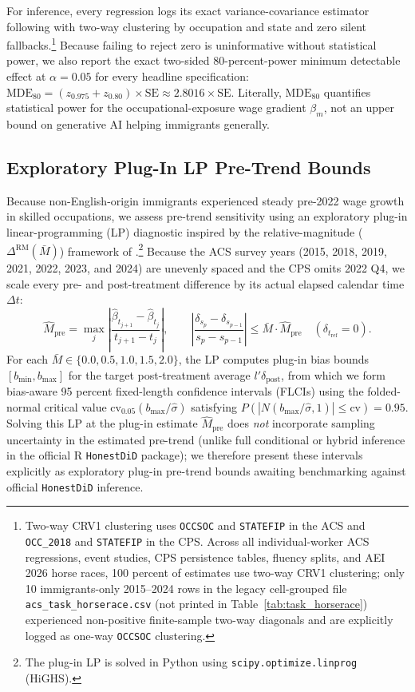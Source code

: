 \documentclass[11pt]{amsart}
\begin{document}
For inference, every regression logs its exact variance-covariance estimator following \citet{CameronGelbachMiller2011} with two-way clustering by occupation and state and zero silent fallbacks.\footnote{Two-way CRV1 clustering uses \texttt{OCCSOC} and \texttt{STATEFIP} in the ACS and \texttt{OCC\_2018} and \texttt{STATEFIP} in the CPS. Across all individual-worker ACS regressions, event studies, CPS persistence tables, fluency splits, and AEI 2026 horse races, 100 percent of estimates use two-way CRV1 clustering; only 10 immigrants-only 2015--2024 rows in the legacy cell-grouped file \texttt{acs\_task\_horserace.csv} (not printed in Table~\ref{tab:task_horserace}) experienced non-positive finite-sample two-way diagonals and are explicitly logged as one-way \texttt{OCCSOC} clustering.} Because failing to reject zero is uninformative without statistical power, we also report the exact two-sided 80-percent-power minimum detectable effect at $\alpha = 0.05$ for every headline specification: $\text{MDE}_{80} = (z_{0.975} + z_{0.80}) \times \text{SE} \approx 2.8016 \times \text{SE}$. Literally, $\text{MDE}_{80}$ quantifies statistical power for the occupational-exposure wage gradient $\beta_m$, not an upper bound on generative AI helping immigrants generally.

\subsection{Exploratory Plug-In LP Pre-Trend Bounds}

Because non-English-origin immigrants experienced steady pre-2022 wage growth in skilled occupations, we assess pre-trend sensitivity using an exploratory plug-in linear-programming (LP) diagnostic inspired by the relative-magnitude ($\Delta^{\text{RM}}(\bar{M})$) framework of \citet{RambachanRoth2023}.\footnote{The plug-in LP is solved in Python using \texttt{scipy.optimize.linprog} (HiGHS).} Because the ACS survey years (2015, 2018, 2019, 2021, 2022, 2023, and 2024) are unevenly spaced and the CPS omits 2022 Q4, we scale every pre- and post-treatment difference by its actual elapsed calendar time $\Delta t$:
\begin{equation}
\hat{M}_{\text{pre}} = \max_{j} \left|\frac{\hat{\beta}_{t_{j+1}} - \hat{\beta}_{t_j}}{t_{j+1} - t_j}\right|, \qquad \left|\frac{\delta_{s_p} - \delta_{s_{p-1}}}{s_p - s_{p-1}}\right| \le \bar{M} \cdot \hat{M}_{\text{pre}} \quad (\delta_{t_{\text{ref}}} = 0).
\end{equation}
For each $\bar{M} \in \{0.0, 0.5, 1.0, 1.5, 2.0\}$, the LP computes plug-in bias bounds $[b_{\min}, b_{\max}]$ for the target post-treatment average $l'\delta_{\text{post}}$, from which we form bias-aware 95 percent fixed-length confidence intervals (FLCIs) using the folded-normal critical value $\text{cv}_{0.05}(b_{\max}/\hat{\sigma})$ satisfying $P(|N(b_{\max}/\hat{\sigma}, 1)| \le \text{cv}) = 0.95$. Solving this LP at the plug-in estimate $\hat{M}_{\text{pre}}$ does \emph{not} incorporate sampling uncertainty in the estimated pre-trend (unlike full conditional or hybrid inference in the official R \texttt{HonestDiD} package); we therefore present these intervals explicitly as exploratory plug-in pre-trend bounds awaiting benchmarking against official \texttt{HonestDiD} inference.
\end{document}
